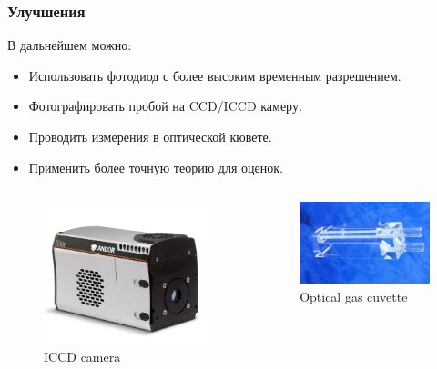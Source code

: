 \documentclass{beamer}
\begin{document}
	\begin{frame}
		\frametitle{Улучшения}
		В дальнейшем можно:
		\begin{itemize}
			\item Использовать фотодиод с более высоким временным разрешением.
			\item Фотографировать пробой на CCD/ICCD камеру.
			\item Проводить измерения в оптической кювете.
			\item Применить более точную теорию для оценок.
		\end{itemize}
		
		\begin{columns}
			\begin{figure}
				\centering
				\includegraphics[width=0.9\linewidth]{res/iccd_camera.png}
				\caption*{ICCD camera}
			\end{figure}
			\begin{figure}
				\centering
				\includegraphics[width=0.9\linewidth]{res/gas_cuvette.jpeg}
				\caption*{Optical gas cuvette}
			\end{figure}
		\end{columns}
		
		
	\end{frame}
	
\end{document}

